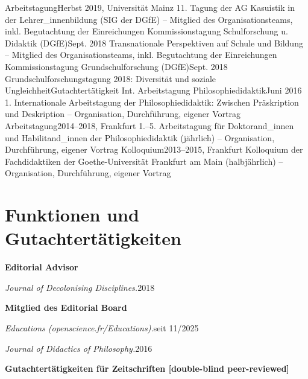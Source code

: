       {Arbeitstagung}{Herbst 2019, Universität Mainz}
      {11. Tagung der AG Kasuistik in der Lehrer\_innenbildung (SIG der DGfE) – Mitglied des Organisationsteams, inkl. Begutachtung der Einreichungen}{}
    \resumeSubheading
      {Kommissionstagung Schulforschung u. Didaktik (DGfE)}{Sept. 2018}
      {Transnationale Perspektiven auf Schule und Bildung – Mitglied des Organisationsteams, inkl. Begutachtung der Einreichungen}{}
    \resumeSubheading
      {Kommissionstagung Grundschulforschung (DGfE)}{Sept. 2018}
      {Grundschulforschungstagung 2018: Diversität und soziale Ungleichheit}{Gutachtertätigkeit}
    \resumeSubheading
      {Int. Arbeitstagung Philosophiedidaktik}{Juni 2016}
      {1. Internationale Arbeitstagung der Philosophiedidaktik: Zwischen Präskription und Deskription – Organisation, Durchführung, eigener Vortrag}{}
    \resumeSubheading
      {Arbeitstagung}{2014–2018, Frankfurt}
      {1.–5. Arbeitstagung für Doktorand\_innen und Habilitand\_innen der Philosophiedidaktik (jährlich) – Organisation, Durchführung, eigener Vortrag}{}
    \resumeSubheading
      {Kolloquium}{2013–2015, Frankfurt}
      {Kolloquium der Fachdidaktiken der Goethe-Universität Frankfurt am Main (halbjährlich) – Organisation, Durchführung, eigener Vortrag}{}
  \resumeSubHeadingListEnd


\section{Funktionen und Gutachtertätigkeiten}
  \vspace{3pt}
  \resumeSubHeadingListStart
\resumeProjectHeading
      {\textbf{Editorial Advisor}}{}

    \resumeProjectHeading
      {\textit{Journal of Decolonising Disciplines.}}{2018}


    \resumeProjectHeading
      {\textbf{Mitglied des Editorial Board}}{}

    \resumeProjectHeading
      {\textit{Educations (openscience.fr/Educations).}}{seit 11/2025}

    \resumeProjectHeading
      {\textit{Journal of Didactics of Philosophy.}}{2016}


    \resumeProjectHeading
      {\textbf{Gutachtertätigkeiten für Zeitschriften [double-blind peer-reviewed]}}{}

    \resumeItemListStart
    \resumeItemListEnd

